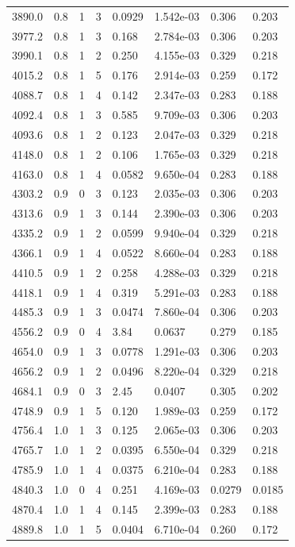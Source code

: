 \documentclass[preview]{standalone}
\begin{document}
{{{\begin{tabular}{L{1.2cm}C{1.2cm} C{0.3cm}C{0.5cm} C{1.4cm}C{1.4cm} C{1.4cm}C{1.4cm}}
  3890.0  &   0.8  & 1     &  3 &  0.0929  & 1.542e-03  & 0.306 &  0.203   \\ 
  3977.2  &   0.8  & 1     &  3 &  0.168  & 2.784e-03  & 0.306 &  0.203   \\ 
  3990.1  &   0.8  & 1     &  2 &  0.250  & 4.155e-03  & 0.329 &  0.218   \\ 
  4015.2  &   0.8  & 1     &  5 &  0.176  & 2.914e-03  & 0.259 &  0.172   \\ 
  4088.7  &   0.8  & 1     &  4 &  0.142  & 2.347e-03  & 0.283 &  0.188   \\ 
  4092.4  &   0.8  & 1     &  3 &  0.585  & 9.709e-03  & 0.306 &  0.203   \\ 
  4093.6  &   0.8  & 1     &  2 &  0.123  & 2.047e-03  & 0.329 &  0.218   \\ 
  4148.0  &   0.8  & 1     &  2 &  0.106  & 1.765e-03  & 0.329 &  0.218   \\ 
  4163.0  &   0.8  & 1     &  4 &  0.0582  & 9.650e-04  & 0.283 &  0.188   \\ 
  4303.2  &   0.9  & 0     &  3 &  0.123  & 2.035e-03  & 0.306 &  0.203   \\ 
  4313.6  &   0.9  & 1     &  3 &  0.144  & 2.390e-03  & 0.306 &  0.203   \\ 
  4335.2  &   0.9  & 1     &  2 &  0.0599  & 9.940e-04  & 0.329 &  0.218   \\ 
  4366.1  &   0.9  & 1     &  4 &  0.0522  & 8.660e-04  & 0.283 &  0.188   \\ 
  4410.5  &   0.9  & 1     &  2 &  0.258  & 4.288e-03  & 0.329 &  0.218   \\ 
  4418.1  &   0.9  & 1     &  4 &  0.319  & 5.291e-03  & 0.283 &  0.188   \\ 
  4485.3  &   0.9  & 1     &  3 &  0.0474  & 7.860e-04  & 0.306 &  0.203   \\ 
  4556.2  &   0.9  & 0     &  4 &  3.84  & 0.0637  & 0.279 &  0.185   \\ 
  4654.0  &   0.9  & 1     &  3 &  0.0778  & 1.291e-03  & 0.306 &  0.203   \\ 
  4656.2  &   0.9  & 1     &  2 &  0.0496  & 8.220e-04  & 0.329 &  0.218   \\ 
  4684.1  &   0.9  & 0     &  3 &  2.45  & 0.0407  & 0.305 &  0.202   \\ 
  4748.9  &   0.9  & 1     &  5 &  0.120  & 1.989e-03  & 0.259 &  0.172   \\ 
  4756.4  &   1.0  & 1     &  3 &  0.125  & 2.065e-03  & 0.306 &  0.203   \\ 
  4765.7  &   1.0  & 1     &  2 &  0.0395  & 6.550e-04  & 0.329 &  0.218   \\ 
  4785.9  &   1.0  & 1     &  4 &  0.0375  & 6.210e-04  & 0.283 &  0.188   \\ 
  4840.3  &   1.0  & 0     &  4 &  0.251  & 4.169e-03  & 0.0279 &  0.0185   \\ 
  4870.4  &   1.0  & 1     &  4 &  0.145  & 2.399e-03  & 0.283 &  0.188   \\ 
  4889.8  &   1.0  & 1     &  5 &  0.0404  & 6.710e-04  & 0.260 &  0.172   \\ 
\hline 
\end{tabular} 

}}}
\end{document}
